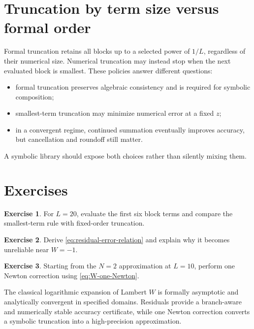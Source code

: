 \documentclass[11pt,openany]{book}
\theoremstyle{definition}
\newtheorem{exercise}{Exercise}[chapter]
\theoremstyle{plain}
\theoremstyle{remark}
\begin{document}
\section{Truncation by term size versus formal order}
Formal truncation retains all blocks up to a selected power of \(1/L\), regardless of their numerical size. Numerical truncation may instead stop when the next evaluated block is smallest. These policies answer different questions:
\begin{itemize}
\item formal truncation preserves algebraic consistency and is required for symbolic composition;
\item smallest-term truncation may minimize numerical error at a fixed \(z\);
\item in a convergent regime, continued summation eventually improves accuracy, but cancellation and roundoff still matter.
\end{itemize}
A symbolic library should expose both choices rather than silently mixing them.

\section{Exercises}
\begin{exercise}
For \(L=20\), evaluate the first six block terms and compare the smallest-term rule with fixed-order truncation.
\end{exercise}
\begin{exercise}
Derive \cref{eq:residual-error-relation} and explain why it becomes unreliable near \(W=-1\).
\end{exercise}
\begin{exercise}
Starting from the \(N=2\) approximation at \(L=10\), perform one Newton correction using \cref{eq:W-one-Newton}.
\end{exercise}

\begin{summarybox}
The classical logarithmic expansion of Lambert \(W\) is formally asymptotic and analytically convergent in specified domains. Residuals provide a branch-aware and numerically stable accuracy certificate, while one Newton correction converts a symbolic truncation into a high-precision approximation.
\end{summarybox}

\end{document}
